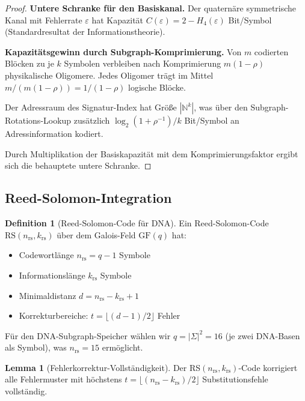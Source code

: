﻿\documentclass[a4paper,12pt]{article}
\theoremstyle{definition}
\newtheorem{definition}{Definition}
\newtheorem{lemma}{Lemma}
\begin{document}
\begin{proof}
    \textbf{Untere Schranke f\"{u}r den Basiskanal.}
    Der quaternäre symmetrische Kanal mit Fehlerrate $\varepsilon$ hat
    Kapazit\"{a}t $C(\varepsilon) = 2 - H_4(\varepsilon)$ Bit/Symbol
    (Standardresultat der Informationstheorie).

    \textbf{Kapazit\"{a}tsgewinn durch Subgraph-Komprimierung.}
    Von $m$ codierten Bl\"{o}cken zu je $k$ Symbolen verbleiben nach
    Komprimierung $m(1-\rho)$ physikalische Oligomere. Jedes Oligomer
    tr\"{a}gt im Mittel $m / (m(1-\rho)) = 1/(1-\rho)$ logische Bl\"{o}cke.

    Der Adressraum des Signatur-Index hat Gr\"{o}\ss{}e $|\mathbb{N}^k|$,
    was \"{u}ber den Subgraph-Rotations-Lookup zus\"{a}tzlich
    $\log_2(1 + \rho^{-1}) / k$ Bit/Symbol an Adressinformation kodiert.

    Durch Multiplikation der Basiskapazit\"{a}t mit dem Komprimierungsfaktor
    ergibt sich die behauptete untere Schranke. 
\end{proof}

\subsection{Reed-Solomon-Integration}

\begin{definition}[Reed-Solomon-Code f\"{u}r DNA]
    \label{def:reedsolomon}
    Ein Reed-Solomon-Code $\mathrm{RS}(n_{\mathrm{rs}}, k_{\mathrm{rs}})$
    \"{u}ber dem Galois-Feld $\mathrm{GF}(q)$ hat:
    \begin{itemize}
        \item Codewortl\"{a}nge $n_{\mathrm{rs}} = q - 1$ Symbole
        \item Informationsl\"{a}nge $k_{\mathrm{rs}}$ Symbole
        \item Minimaldistanz $d = n_{\mathrm{rs}} - k_{\mathrm{rs}} + 1$
        \item Korrekturbereiche: $t = \lfloor (d-1)/2 \rfloor$ Fehler
    \end{itemize}
    F\"{u}r den DNA-Subgraph-Speicher w\"{a}hlen wir $q = |\Sigma|^2 = 16$
    (je zwei DNA-Basen als Symbol), was $n_{\mathrm{rs}} = 15$ erm\"{o}glicht.
\end{definition}

\begin{lemma}[Fehlerkorrektur-Vollst\"{a}ndigkeit]
    \label{lem:ecc}
    Der RS$(n_{\mathrm{rs}}, k_{\mathrm{rs}})$-Code korrigiert alle
    Fehlermuster mit h\"{o}chstens $t = \lfloor(n_{\mathrm{rs}} -
    k_{\mathrm{rs}})/2\rfloor$ Substitutionsfehle vollst\"{a}ndig.
\end{lemma}
\end{document}

